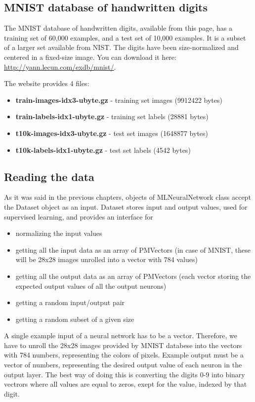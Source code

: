 \subsection{MNIST database of handwritten digits}
The MNIST database of handwritten digits, available from this page, has a training set of 60,000 examples, and a test set of 10,000 examples. It is a subset of a larger set available from NIST. The digits have been size-normalized and centered in a fixed-size image. You can download it here: \url{http://yann.lecun.com/exdb/mnist/}.

The website provides 4 files:
\begin{itemize}
  \item \textbf{train-images-idx3-ubyte.gz} - training set images (9912422 bytes)
  \item \textbf{train-labels-idx1-ubyte.gz} - training set labels (28881 bytes)
  \item \textbf{t10k-images-idx3-ubyte.gz} - test set images (1648877 bytes)
  \item \textbf{t10k-labels-idx1-ubyte.gz} - test set labels (4542 bytes) 
\end{itemize}

\subsection{Reading the data}
As it was said in the previous chapters, objects of MLNeuralNetwork class accept the Dataset object as an input. Dataset stores input and output values, used for supervised learning, and provides an interface for
\begin{itemize}
  \item normalizing the input values
  \item getting all the input data as an array of PMVectors (in case of MNIST, these will be 28x28 images unrolled into a vector with 784 values)
  \item getting all the output data as an array of PMVectors (each vector storing the expected output values of all the output neurons)
  \item getting a random input/output pair
  \item getting a random subset of a given size
\end{itemize}

A single example input of a neural network has to be a vector. Therefore, we have to unroll the 28x28 images provided by MNIST databese into the vectors with 784 numbers, representing the colors of pixels. Example output must be a vector of numbers, representing the desired output value of each neuron in the output layer. The best way of doing this is converting the digits 0-9 into binary vectrors where all values are equal to zeros, exept for the value, indexed by that digit.

